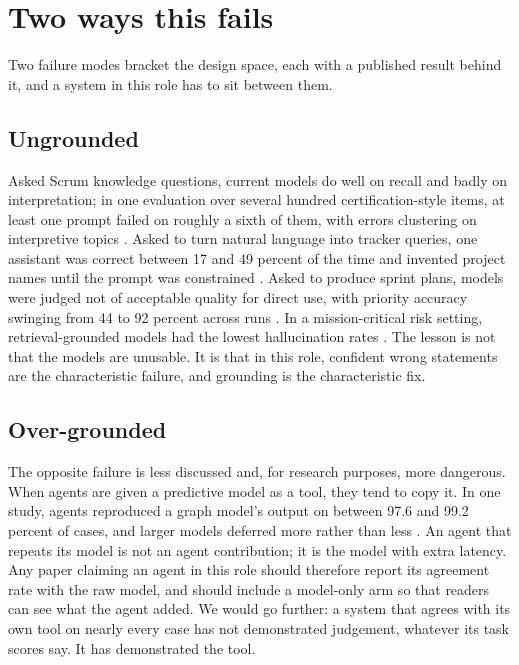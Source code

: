 \documentclass[conference]{IEEEtran}
\begin{document}
\section{Two ways this fails}
\label{sec:failure}

Two failure modes bracket the design space, each with a published result behind it, and a system in this role has to sit between them.

\subsection{Ungrounded}

Asked Scrum knowledge questions, current models do well on recall and badly on interpretation; in one evaluation over several hundred certification-style items, at least one prompt failed on roughly a sixth of them, with errors clustering on interpretive topics \cite{psm}. Asked to turn natural language into tracker queries, one assistant was correct between 17 and 49 percent of the time and invented project names until the prompt was constrained \cite{jql}. Asked to produce sprint plans, models were judged not of acceptable quality for direct use, with priority accuracy swinging from 44 to 92 percent across runs \cite{yoon}. In a mission-critical risk setting, retrieval-grounded models had the lowest hallucination rates \cite{esem24}. The lesson is not that the models are unusable. It is that in this role, confident wrong statements are the characteristic failure, and grounding is the characteristic fix.

\subsection{Over-grounded}

The opposite failure is less discussed and, for research purposes, more dangerous. When agents are given a predictive model as a tool, they tend to copy it. In one study, agents reproduced a graph model's output on between 97.6 and 99.2 percent of cases, and larger models deferred more rather than less \cite{tool}. An agent that repeats its model is not an agent contribution; it is the model with extra latency. Any paper claiming an agent in this role should therefore report its agreement rate with the raw model, and should include a model-only arm so that readers can see what the agent added. We would go further: a system that agrees with its own tool on nearly every case has not demonstrated judgement, whatever its task scores say. It has demonstrated the tool.
\end{document}
